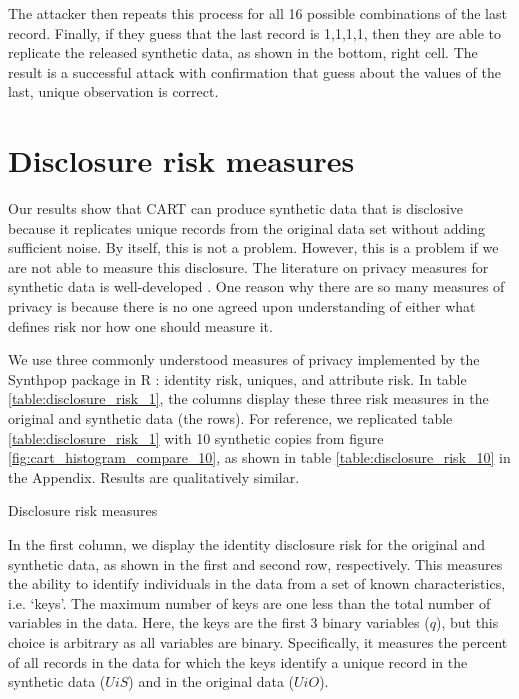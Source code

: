 \documentclass[runningheads]{llncs}
\begin{document}
The attacker then repeats this process for all 16 possible combinations of the last record.  Finally, if they guess that the last record is 1,1,1,1, then they are able to replicate the released synthetic data, as shown in the bottom, right cell.  The result is a successful attack with confirmation that guess about the values of the last, unique observation is correct.

\section{Disclosure risk measures}

Our results show that CART can produce synthetic data that is disclosive because it replicates unique records from the original data set without adding sufficient noise.  By itself, this is not a problem.  However, this is a problem if we are not able to measure this disclosure.  The literature on privacy measures for synthetic data is well-developed \cite{wagner2018technical}.  One reason why there are so many measures of privacy is because there is no one agreed upon understanding of either what defines risk nor how one should measure it.  

We use three commonly understood measures of privacy implemented by the Synthpop package in R \cite{raab2024practical}: identity risk, uniques, and attribute risk.  In table \ref{table:disclosure_risk_1}, the columns display these three risk measures in the original and synthetic data (the rows).  For reference, we replicated table \ref{table:disclosure_risk_1} with 10 synthetic copies from figure \ref{fig:cart_histogram_compare_10}, as shown in table \ref{table:disclosure_risk_10} in the Appendix.  Results are qualitatively similar.  

\begin{table}[]
    \centering
    \caption{Disclosure risk measures}
    
    \label{table:disclosure_risk_1}
\end{table}

In the first column, we display the identity disclosure risk for the original and synthetic data, as shown in the first and second row, respectively.  This measures the ability to identify individuals in the data from a set of known characteristics, i.e. `keys'. The maximum number of keys are one less than the total number of variables in the data.  Here, the keys are the first 3 binary variables ($q$), but this choice is arbitrary as all variables are binary.  Specifically, it measures the percent of all records in the data for which the keys identify a unique record in the synthetic data ($UiS$) and in the original data ($UiO$).  
\end{document}
